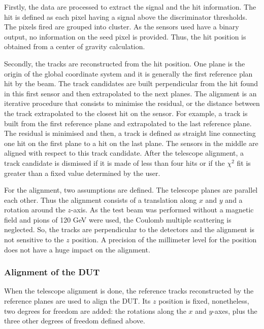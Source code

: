       Firstly, the data are processed to extract the signal and the hit information.
      The hit is defined as each pixel having a signal above the discriminator thresholds.
      The pixels fired are grouped into cluster.
      As the sensors used have a binary output, no information on the seed pixel is provided.
      Thus, the hit position is obtained from a center of gravity calculation.

      Secondly, the tracks are reconstructed from the hit position.
      One plane is the origin of the global coordinate system and it is generally the first reference plan hit by the beam.
      The track candidates are built perpendicular from the hit found in this first sensor and then extrapolated to the next planes.
      The alignment is an iterative procedure that consists to minimise the residual, or the distance between the track extrapolated to the closest hit on the sensor.
      For example, a track is built from the first reference plane and extrapolated to the last reference plane.
      The residual is minimised and then, a track is defined as straight line connecting one hit on the first plane to a hit on the last plane.
      The sensors in the middle are aligned with respect to this track candidate.
      After the telescope alignment, a track candidate is dismissed if it is made of less than four hits or if the $\chi^2$ fit is greater than a fixed value determined by the user. 

      For the alignment, two assumptions are defined. 
      The telescope planes are parallel each other.
      Thus the alignment consists of a translation along $x$ and $y$ and a rotation around the $z$-axis.
      As the test beam was performed without a magnetic field and pions of 120 GeV were used, the Coulomb multiple scattering is neglected.
      So, the tracks are perpendicular to the detectors and the alignment is not sensitive to the $z$ position.
      A precision of the millimeter level for the position does not have a huge impact on the alignment.

      \subsubsection{Alignment of the DUT}

      When the telescope alignment is done, the reference tracks reconstructed by the reference planes are used to align the \gls{DUT}.
      Its $z$ position is fixed, nonetheless, two degrees for freedom are added: the rotations along the $x$ and $y$-axes, plus the three other degrees of freedom defined above.

